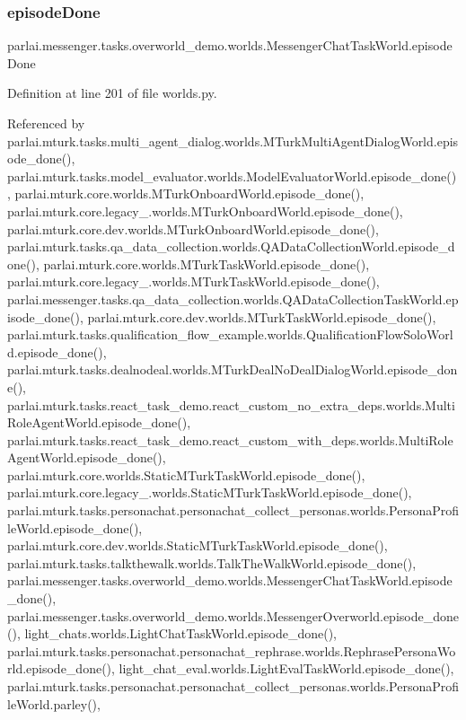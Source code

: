 \subsubsection{\texorpdfstring{episode\+Done}{episodeDone}}
{\footnotesize\ttfamily parlai.\+messenger.\+tasks.\+overworld\+\_\+demo.\+worlds.\+Messenger\+Chat\+Task\+World.\+episode\+Done}



Definition at line 201 of file worlds.\+py.



Referenced by parlai.\+mturk.\+tasks.\+multi\+\_\+agent\+\_\+dialog.\+worlds.\+M\+Turk\+Multi\+Agent\+Dialog\+World.\+episode\+\_\+done(), parlai.\+mturk.\+tasks.\+model\+\_\+evaluator.\+worlds.\+Model\+Evaluator\+World.\+episode\+\_\+done(), parlai.\+mturk.\+core.\+worlds.\+M\+Turk\+Onboard\+World.\+episode\+\_\+done(), parlai.\+mturk.\+core.\+legacy\+\_.\+worlds.\+M\+Turk\+Onboard\+World.\+episode\+\_\+done(), parlai.\+mturk.\+core.\+dev.\+worlds.\+M\+Turk\+Onboard\+World.\+episode\+\_\+done(), parlai.\+mturk.\+tasks.\+qa\+\_\+data\+\_\+collection.\+worlds.\+Q\+A\+Data\+Collection\+World.\+episode\+\_\+done(), parlai.\+mturk.\+core.\+worlds.\+M\+Turk\+Task\+World.\+episode\+\_\+done(), parlai.\+mturk.\+core.\+legacy\+\_.\+worlds.\+M\+Turk\+Task\+World.\+episode\+\_\+done(), parlai.\+messenger.\+tasks.\+qa\+\_\+data\+\_\+collection.\+worlds.\+Q\+A\+Data\+Collection\+Task\+World.\+episode\+\_\+done(), parlai.\+mturk.\+core.\+dev.\+worlds.\+M\+Turk\+Task\+World.\+episode\+\_\+done(), parlai.\+mturk.\+tasks.\+qualification\+\_\+flow\+\_\+example.\+worlds.\+Qualification\+Flow\+Solo\+World.\+episode\+\_\+done(), parlai.\+mturk.\+tasks.\+dealnodeal.\+worlds.\+M\+Turk\+Deal\+No\+Deal\+Dialog\+World.\+episode\+\_\+done(), parlai.\+mturk.\+tasks.\+react\+\_\+task\+\_\+demo.\+react\+\_\+custom\+\_\+no\+\_\+extra\+\_\+deps.\+worlds.\+Multi\+Role\+Agent\+World.\+episode\+\_\+done(), parlai.\+mturk.\+tasks.\+react\+\_\+task\+\_\+demo.\+react\+\_\+custom\+\_\+with\+\_\+deps.\+worlds.\+Multi\+Role\+Agent\+World.\+episode\+\_\+done(), parlai.\+mturk.\+core.\+worlds.\+Static\+M\+Turk\+Task\+World.\+episode\+\_\+done(), parlai.\+mturk.\+core.\+legacy\+\_.\+worlds.\+Static\+M\+Turk\+Task\+World.\+episode\+\_\+done(), parlai.\+mturk.\+tasks.\+personachat.\+personachat\+\_\+collect\+\_\+personas.\+worlds.\+Persona\+Profile\+World.\+episode\+\_\+done(), parlai.\+mturk.\+core.\+dev.\+worlds.\+Static\+M\+Turk\+Task\+World.\+episode\+\_\+done(), parlai.\+mturk.\+tasks.\+talkthewalk.\+worlds.\+Talk\+The\+Walk\+World.\+episode\+\_\+done(), parlai.\+messenger.\+tasks.\+overworld\+\_\+demo.\+worlds.\+Messenger\+Chat\+Task\+World.\+episode\+\_\+done(), parlai.\+messenger.\+tasks.\+overworld\+\_\+demo.\+worlds.\+Messenger\+Overworld.\+episode\+\_\+done(), light\+\_\+chats.\+worlds.\+Light\+Chat\+Task\+World.\+episode\+\_\+done(), parlai.\+mturk.\+tasks.\+personachat.\+personachat\+\_\+rephrase.\+worlds.\+Rephrase\+Persona\+World.\+episode\+\_\+done(), light\+\_\+chat\+\_\+eval.\+worlds.\+Light\+Eval\+Task\+World.\+episode\+\_\+done(), parlai.\+mturk.\+tasks.\+personachat.\+personachat\+\_\+collect\+\_\+personas.\+worlds.\+Persona\+Profile\+World.\+parley(), 